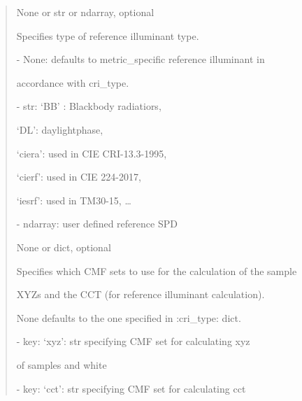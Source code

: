 \documentclass[letterpaper,10pt,english]{sphinxmanual}
\begin{document}
\begin{fulllineitems}
\begin{description}
\begin{quote}
\begin{description}
\item[{ref\_type}] \leavevmode
\begin{DUlineblock}{0em}
\item[] None or str or ndarray, optional
\item[] Specifies type of reference illuminant type.
\item[]
\begin{DUlineblock}{\DUlineblockindent}
\item[] - None: defaults to metric\_specific reference illuminant in 
\item[]
\begin{DUlineblock}{\DUlineblockindent}
\item[] accordance with cri\_type.
\end{DUlineblock}
\item[] - str: ‘BB’ : Blackbody radiatiors, 
\item[]
\begin{DUlineblock}{\DUlineblockindent}
\item[] ‘DL’: daylightphase, 
\item[] ‘ciera’: used in CIE CRI-13.3-1995, 
\item[] ‘cierf’: used in CIE 224-2017, 
\item[] ‘iesrf’: used in TM30-15, …
\end{DUlineblock}
\item[] - ndarray: user defined reference SPD
\end{DUlineblock}
\end{DUlineblock}

\item[{cieobs}] \leavevmode
\begin{DUlineblock}{0em}
\item[] None or dict, optional
\item[] Specifies which CMF sets to use for the calculation of the sample 
\item[] XYZs and the CCT (for reference illuminant calculation).
\item[] None defaults to the one specified in :cri\_type: dict.    
\item[]
\begin{DUlineblock}{\DUlineblockindent}
\item[] - key: ‘xyz’: str specifying CMF set for calculating xyz 
\item[]
\begin{DUlineblock}{\DUlineblockindent}
\item[] of samples and white 
\end{DUlineblock}
\item[] - key: ‘cct’: str specifying CMF set for calculating cct
\end{DUlineblock}
\end{DUlineblock}


\end{description}
\end{quote}
\end{description}
\end{fulllineitems}
\end{document}
